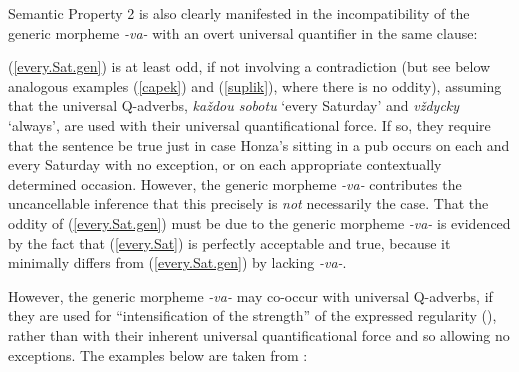 \documentclass[output=paper,colorlinks,citecolor=brown]{langscibook}
\begin{document}
\noindent Semantic Property 2 is also
clearly manifested in the incompatibility of
the generic morpheme \textit{-va-} with an overt universal quantifier in the same clause:

\ea
{}
\z
\z

\noindent
(\ref{every.Sat.gen}) is at least odd, if not
involving a contradiction (but see below analogous examples (\ref{capek}) and (\ref{suplik}), where there is no oddity), assuming that the universal Q-adverbs, \textit{každou sobotu} `every Saturday' and \textit{vždycky} `always', are used with their universal quantificational force.
If so, they require that
the sentence be true just in case Honza's sitting in a pub occurs on each and every Saturday with no exception, or on each appropriate contextually determined occasion. However, the generic morpheme \textit{-va-} contributes the uncancellable inference that
this precisely is \textit{not} necessarily the case.
That the oddity of (\ref{every.Sat.gen}) must be due to the generic morpheme \textit{-va-} is evidenced by
the fact that (\ref{every.Sat}) is perfectly acceptable and true, because it minimally differs from  (\ref{every.Sat.gen}) by lacking \textit{-va-}.

However, the generic morpheme \textit{-va-} may co-occur with universal Q-adverbs, if they are
used for ``intensification of the strength''
of the expressed regularity  (\citealt [45]{danaher2003semantics}),
rather than with their inherent universal quantificational force and so allowing no exceptions. The examples below are taken from  \citet [45]{danaher2003semantics}:
\end{document}
